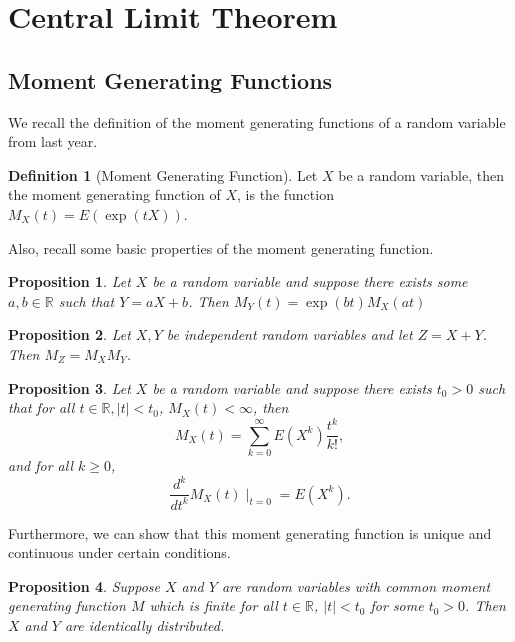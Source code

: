 \documentclass[
]{article}
\newtheorem{prop}{Proposition}[theorem]
\theoremstyle{definition}
\newtheorem{definition}{Definition}[section]
\begin{document}
\newpage

\hypertarget{central-limit-theorem}{%
\section{Central Limit Theorem}\label{central-limit-theorem}}

\hypertarget{moment-generating-functions}{%
\subsection{Moment Generating
Functions}\label{moment-generating-functions}}

We recall the definition of the moment generating functions of a random
variable from last year.

\begin{definition}[Moment Generating Function]
  Let \(X\) be a random variable, then the moment generating function of \(X\), 
  is the function \(M_X(t) = E(\exp(tX))\). 
\end{definition}

Also, recall some basic properties of the moment generating function.

\begin{prop}
  Let \(X\) be a random variable and suppose there exists some 
  \(a, b \in \mathbb{R}\) such that \(Y = aX + b\). Then \(M_Y(t) = \exp(bt)M_X(at)\)
\end{prop}
\begin{prop}
  Let \(X, Y\) be independent random variables and let \(Z = X + Y\). Then 
  \(M_Z = M_X M_Y\).
\end{prop}
\begin{prop}
  Let \(X\) be a random variable and suppose there exists \(t_0 > 0\) such that 
  for all \(t \in \mathbb{R}, \left| t \right| < t_0\), \(M_X(t) < \infty\), 
  then 
  \[M_X(t) = \sum_{k = 0}^\infty E(X^k) \frac{t^k}{k!},\]
  and for all \(k \ge 0\), 
  \[\frac{d^k}{dt^k}M_X(t)\mid_{t = 0} = E(X^k).\]
\end{prop}

Furthermore, we can show that this moment generating function is unique
and continuous under certain conditions.

\begin{prop}
  Suppose \(X\) and \(Y\) are random variables with common moment generating 
  function \(M\) which is finite for all \(t \in \mathbb{R}\), 
  \(\left| t \right| < t_0\) for some \(t_0 > 0\). Then \(X\) and \(Y\) are 
  identically distributed.
\end{prop}
\end{document}
